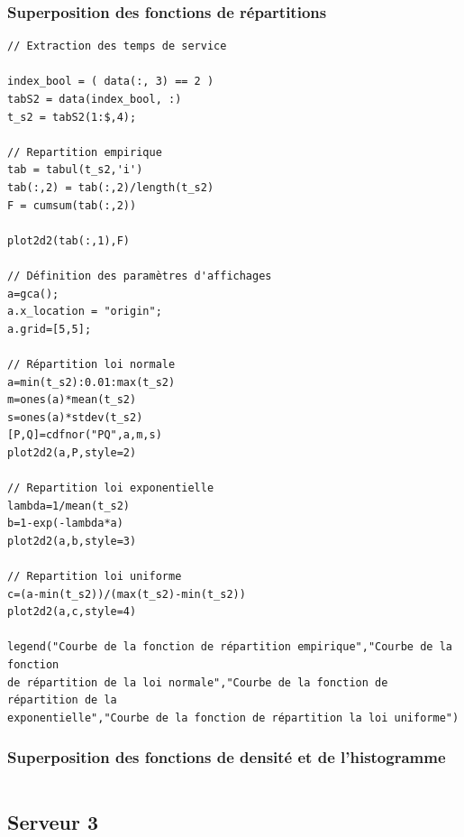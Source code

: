 \documentclass{article}
\begin{document}
\subsubsection{Superposition des fonctions de répartitions}
\begin{verbatim}
// Extraction des temps de service

index_bool = ( data(:, 3) == 2 )
tabS2 = data(index_bool, :)
t_s2 = tabS2(1:$,4);

// Repartition empirique
tab = tabul(t_s2,'i')
tab(:,2) = tab(:,2)/length(t_s2)
F = cumsum(tab(:,2))

plot2d2(tab(:,1),F)

// Définition des paramètres d'affichages
a=gca();
a.x_location = "origin";
a.grid=[5,5];

// Répartition loi normale
a=min(t_s2):0.01:max(t_s2)
m=ones(a)*mean(t_s2)
s=ones(a)*stdev(t_s2)
[P,Q]=cdfnor("PQ",a,m,s)
plot2d2(a,P,style=2)

// Repartition loi exponentielle
lambda=1/mean(t_s2)
b=1-exp(-lambda*a)
plot2d2(a,b,style=3)

// Repartition loi uniforme
c=(a-min(t_s2))/(max(t_s2)-min(t_s2))
plot2d2(a,c,style=4)

legend("Courbe de la fonction de répartition empirique","Courbe de la fonction 
de répartition de la loi normale","Courbe de la fonction de répartition de la 
exponentielle","Courbe de la fonction de répartition la loi uniforme")
\end{verbatim}

\subsubsection{Superposition des fonctions de densité et de l'histogramme}
\begin{verbatim}
\end{verbatim}

\subsection{Serveur 3}
\end{document}
